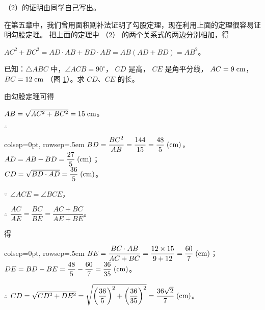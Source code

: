 \begin{enhancedline}
（2）的证明由同学自己写出。

在第五章中，我们曾用面积割补法证明了勾股定理，现在利用上面的定理很容易证明勾股定理。
把上面的定理中 （2） 的两个关系式的两边分别相加，得

$AC^2 + BC^2 = AD \cdot AB + BD \cdot AB = AB(AD + BD) = AB^2$。

\begin{figure}[htbp]
    \centering
    \begin{minipage}[b]{7cm}
        \centering
        
        \caption{}\label{fig:czjh2-6-32}
    \end{minipage}
    \qquad
    \begin{minipage}[b]{7cm}
        \centering
        
        \caption{}\label{fig:czjh2-6-33}
    \end{minipage}
\end{figure}

\liti 已知：$\triangle ABC$ 中，$\angle ACB = 90^\circ$， $CD$ 是高， $CE$ 是角平分线，
$AC = 9\;\mathord{\text{cm}}$， $BC = 12\;\mathord{\text{cm}}$ （图 \ref{fig:czjh2-6-33}）。求 $CD$、$CE$ 的长。

\jie 由勾股定理可得

$AB = \sqrt{AC^2 + BC^2} = 15 \;\mathord{\text{cm}}$。

$\therefore$ \quad \begin{tblr}[t]{colsep=0pt, rowsep=.5em}
    $BD = \dfrac{BC^2}{AB} = \dfrac{144}{15} = \dfrac{48}{5} \;(\mathord{\text{cm}})$， \\
    $AD = AB - BD = \dfrac{27}{5} \;(\mathord{\text{cm}})$； \\
    $CD = \sqrt{BD \cdot AD} = \dfrac{36}{5} \;(\mathord{\text{cm}})$。
\end{tblr}

$\because$ \quad $\angle ACE = \angle BCE$，

$\therefore$ \quad $\dfrac{AC}{AE} = \dfrac{BC}{BE} = \dfrac{AC + BC}{AE + BE}$。

得 \quad \begin{tblr}[t]{colsep=0pt, rowsep=.5em}
    $BE = \dfrac{BC \cdot AB}{AC + BC} = \dfrac{12 \times 15}{9 + 12} = \dfrac{60}{7} \;(\mathord{\text{cm}})$； \\
    $DE = BD - BE = \dfrac{48}{5} - \dfrac{60}{7} = \dfrac{36}{35} \;(\mathord{\text{cm}})$。
\end{tblr}

$\therefore$ \quad $CD = \sqrt{CD^2 + DE^2} = \sqrt{\left(\dfrac{36}{5}\right)^2 + \left(\dfrac{36}{35}\right)^2} = \dfrac{36\sqrt{2}}{7} \;(\mathord{\text{cm}})$。



\end{enhancedline}
